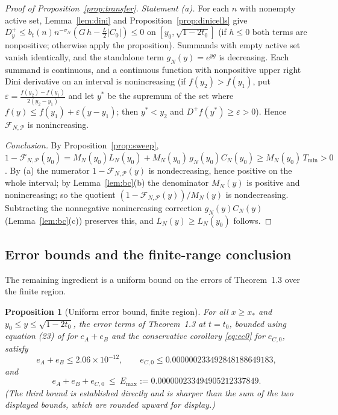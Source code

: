\documentclass[11pt]{article}
\newtheorem{proposition}[theorem]{Proposition}
\theoremstyle{definition}
\newcommand{\eps}{\varepsilon}
\newcommand{\calP}{\mathcal{P}}
\begin{document}
\begin{proof}[Proof of Proposition~\ref{prop:transfer}]
\emph{Statement (a).} For each $n$ with nonempty active set,
Lemma~\ref{lem:dini} and Proposition~\ref{prop:dinicells} give
$D^+_y\le b_t(n)n^{-\sigma_N}(G\,h-\frac L2|C_0|)\le0$ on
$[y_0,\sqrt{1-2t_0}]$ (if $h\le0$ both terms are nonpositive;
otherwise apply the proposition). Summands with empty active set
vanish identically, and the standalone term $g_N(y)=e^{yg}$ is
decreasing. Each summand is continuous, and a continuous function
with nonpositive upper right Dini derivative on an interval is
nonincreasing (if $f(y_2)>f(y_1)$, put
$\eps=\frac{f(y_2)-f(y_1)}{2(y_2-y_1)}$ and let $y^*$ be the
supremum of the set where $f(y)\le f(y_1)+\eps(y-y_1)$; then
$y^*<y_2$ and $D^+f(y^*)\ge\eps>0$). Hence
$\mathcal F_{N,\calP}$ is nonincreasing.

\emph{Conclusion.} By Proposition~\ref{prop:sweep},
$1-\mathcal F_{N,\calP}(y_0)=M_N(y_0)L_N(y_0)+M_N(y_0)\,
g_N(y_0)C_N(y_0)\ge M_N(y_0)\,T_{\min}>0$. By (a) the numerator
$1-\mathcal F_{N,\calP}(y)$ is nondecreasing, hence positive on the
whole interval; by Lemma~\ref{lem:bc}(b) the denominator $M_N(y)$
is positive and nonincreasing; so the quotient
$(1-\mathcal F_{N,\calP}(y))/M_N(y)$ is nondecreasing. Subtracting
the nonnegative nonincreasing correction $g_N(y)C_N(y)$
(Lemma~\ref{lem:bc}(c)) preserves this, and
$L_N(y)\ge L_N(y_0)$ follows.
\end{proof}

\subsection{Error bounds and the finite-range conclusion}
\label{sec:finiteerr}

The remaining ingredient is a uniform bound on the errors of
Theorem~1.3 over the finite region.

\begin{proposition}[Uniform error bound, finite region]\label{prop:finiteerr}
For all $x\ge x_*$ and $y_0\le y\le\sqrt{1-2t_0}$, the error terms
of Theorem~1.3 at $t=t_0$, bounded using equation (23) of
\cite{Polymath} for $e_A+e_B$ and the conservative corollary
\eqref{eq:ec0} for $e_{C,0}$, satisfy
\[
e_A+e_B\le2.06\times10^{-12},\qquad
e_{C,0}\le0.000000233492848188649183,
\]
and
\[
e_A+e_B+e_{C,0}\ \le\ E_{\max}:=0.000000233494905212337849 .
\]
(The third bound is established directly and is sharper than the
sum of the two displayed bounds, which are rounded upward for
display.)
\end{proposition}
\end{document}
